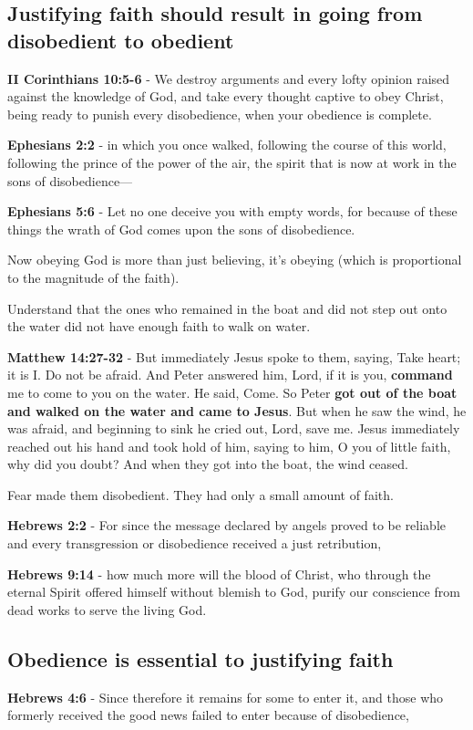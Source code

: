 \documentclass[11pt]{article}
\begin{document}
\subsection{Justifying faith should result in going from disobedient to obedient}
\label{sec:org6b507dd}

\textbf{II Corinthians 10:5-6} - We destroy arguments and every lofty opinion raised against the knowledge of God, and take every thought captive to obey Christ, being ready to punish every disobedience, when your obedience is complete.

\textbf{Ephesians 2:2} - in which you once walked, following the course of this world, following the prince of the power of the air, the spirit that is now at work in the sons of disobedience—

\textbf{Ephesians 5:6} - Let no one deceive you with empty words, for because of these things the wrath of God comes upon the sons of disobedience.

Now obeying God is more than just believing, it's obeying (which is proportional to the magnitude of the faith).

Understand that the ones who remained in the boat and did not step out onto the water did not have enough faith to walk on water.

\textbf{Matthew 14:27-32} - But immediately Jesus spoke to them, saying, Take heart; it is I. Do not be afraid. And Peter answered him, Lord, if it is you, \textbf{command} me to come to you on the water. He said, Come. So Peter \textbf{got out of the boat and walked on the water and came to Jesus}. But when he saw the wind, he was afraid, and beginning to sink he cried out, Lord, save me. Jesus immediately reached out his hand and took hold of him, saying to him, O you of little faith, why did you doubt? And when they got into the boat, the wind ceased.

Fear made them disobedient. They had only a small amount of faith.

\textbf{Hebrews 2:2} - For since the message declared by angels proved to be reliable and every transgression or disobedience received a just retribution,

\textbf{Hebrews 9:14} - how much more will the blood of Christ, who through the eternal Spirit offered himself without blemish to God, purify our conscience from dead works to serve the living God.

\subsection{Obedience is essential to justifying faith}
\label{sec:orge4474cf}
\textbf{Hebrews 4:6} - Since therefore it remains for some to enter it, and those who formerly received the good news failed to enter because of disobedience,
\end{document}
